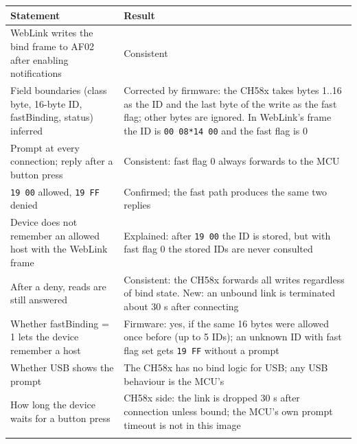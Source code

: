 {\def\LTcaptype{none} %
\begin{longtable}[]{@{}
  >{\raggedright\arraybackslash}p{}
  >{\raggedright\arraybackslash}p{}@{}}
\toprule\noalign{}
\begin{minipage}[b]{\linewidth}\raggedright
Statement
\end{minipage} & \begin{minipage}[b]{\linewidth}\raggedright
Result
\end{minipage} \\
\midrule\noalign{}
\endhead
\bottomrule\noalign{}
\endlastfoot
WebLink writes the bind frame to AF02 after enabling notifications &
Consistent \\
Field boundaries (class byte, 16-byte ID, fastBinding, status) inferred
& Corrected by firmware: the CH58x takes bytes 1..16 as the ID and the
last byte of the write as the fast flag; other bytes are ignored. In
WebLink's frame the ID is \texttt{00\ 08*14\ 00} and the fast flag is
0 \\
Prompt at every connection; reply after a button press & Consistent:
fast flag 0 always forwards to the MCU \\
\texttt{19\ 00} allowed, \texttt{19\ FF} denied & Confirmed; the fast
path produces the same two replies \\
Device does not remember an allowed host with the WebLink frame &
Explained: after \texttt{19\ 00} the ID is stored, but with fast flag 0
the stored IDs are never consulted \\
After a deny, reads are still answered & Consistent: the CH58x forwards
all writes regardless of bind state. New: an unbound link is terminated
about 30 s after connecting \\
Whether fastBinding = 1 lets the device remember a host & Firmware: yes,
if the same 16 bytes were allowed once before (up to 5 IDs); an unknown
ID with fast flag set gets \texttt{19\ FF} without a prompt \\
Whether USB shows the prompt & The CH58x has no bind logic for USB; any
USB behaviour is the MCU's \\
How long the device waits for a button press & CH58x side: the link is
dropped 30 s after connection unless bound; the MCU's own prompt timeout
is not in this image \\*
\end{longtable}
}

